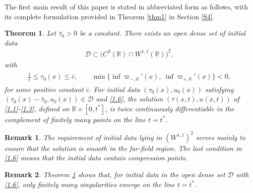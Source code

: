 \documentclass[11pt,reqno]{article}
\newtheorem{thmABC}{Theorem}
\newtheorem{rem}{Remark}
\newcommand{\dps}{\displaystyle}
\newcommand{\fr}{\frac}
\numberwithin{equation}{section}
\begin{document}
The first main result of this paper is stated in abbreviated form as follows, with its complete formulation provided in Theorem \ref{thm1} in Section \ref{S4}.
\begin{thmABC}\label{thmA}
Let $\bar{\tau}_0>0$ be a constant. There exists an open dense set of initial data
\begin{align}\label{1.5}
\mathcal{D}\subset\Big(C^3(\mathbb{R})\cap W^{1,1}(\mathbb{R})\Big)^2,
\end{align}
with
\begin{align}\label{1.6}
\begin{array}{c}
\dps\fr{1}{\overline{c}}\leq \tau_0(x)\leq \overline{c}, \qquad
\dps\min\big\{\inf \varpi_{-,0}'(x),\ \inf \varpi_{+,0}'(x)\big\}<0,
\end{array}
\end{align}
for some positive constant $\overline{c}$. For initial data $(\tau_0(x), u_0(x))$ satisfying $(\tau_0(x)-\bar{\tau}_0, u_0(x))\in \mathcal{D}$ and \eqref{1.6},
the solution $(\tau(x,t), u(x,t))$ of \eqref{1.1}-\eqref{1.3}, defined on $\mathbb{R}\times[0,t^*]$, is twice continuously differentiable in the complement of finitely many points on the line $t=t^*$.
\end{thmABC}
\begin{rem}
The requirement of initial data lying in $(W^{1,1})^2$ serves mainly to ensure that the solution is smooth in the far-field region. The last condition in \eqref{1.6} means that the initial data contain compression points.
\end{rem}
\begin{rem}
Theorem \ref{thmA} shows that, for initial data in the open dense set $\mathcal{D}$ with \eqref{1.6}, only finitely many singularities emerge on the line $t=t^*$.
\end{rem}
\end{document}
